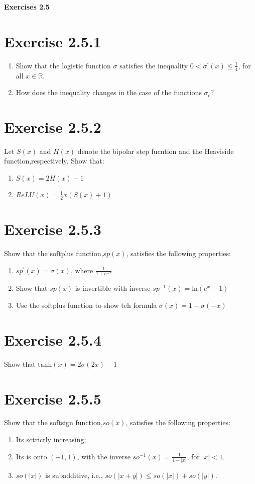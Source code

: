 \documentclass{exam}
\begin{document}
\begin{center}
    \textbf{\Large Exercises 2.5}    
\end{center}

\section*{Exercise 2.5.1}
\begin{enumerate}
    \item Show that the logistic function $\sigma$ satisfies the inequality $ 0 < \sigma^{\prime}(x) \leq \frac{1}{4}$, for all $x \in \mathbb{R}$.
    \item How does the inequality changes in the case of the functions $\sigma_{c}$?
\end{enumerate}  

\section*{Exercise 2.5.2}
Let $S(x)$ and $H(x)$ denote the bipolar step fucntion and the Heaviside function,respectively. Show that: \\
\begin{enumerate}
    \item $S(x) = 2H(x) - 1 $
    \item $ReLU(x) = \frac{1}{2}x(S(x) + 1)$
\end{enumerate}
\section*{Exercise 2.5.3}
Show that the softplus function,$sp(x)$, satisfies the following properties:
\begin{enumerate}
    \item $sp^\prime(x) = \sigma(x)\text{, where } \frac{1}{1 + e^{-x}}$
    \item Show that $sp(x)$ is invertible with inverse $sp^{-1}(x) = \text{ln}(e^x - 1)$
    \item Use the softplus function to show teh formula $\sigma(x) = 1 - \sigma(-x)$
\end{enumerate}

\section*{Exercise 2.5.4}
Show that $\text{tanh}(x) = 2\sigma(2x) - 1 $

\section*{Exercise 2.5.5}
Show that the softsign function,$so(x)$, satisfies the following properties:
\begin{enumerate}
    \item Its sctrictly increasing;
    \item Its is onto $(-1,1)$, with the inverse $so^{-1}(x) = \frac{1}{1 - |x|}$, for $|x| < 1$.
    \item $so(|x|)$ is subadditive, i.e., $so(|x+y|) \leq so(|x|) + so(|y|)$. 
\end{enumerate}
\end{document}
